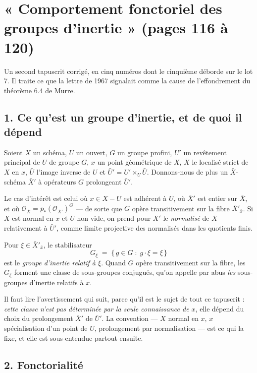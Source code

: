 \documentclass[11pt,a4paper]{article}
\begin{document}
\section*{« Comportement fonctoriel des groupes d'inertie » (pages 116 à 120)}

Un second tapuscrit corrigé, en cinq numéros dont le cinquième déborde sur le
lot 7. Il traite ce que la lettre de 1967 signalait comme la cause de
l'effondrement du théorème 6.4 de Murre.

\subsection*{1. Ce qu'est un groupe d'inertie, et de quoi il dépend}

Soient $X$ un schéma, $U$ un ouvert, $G$ un groupe profini, $U'$ un revêtement
principal de $U$ de groupe $G$, $x$ un point géométrique de $X$, $\bar{X}$ le
localisé strict de $X$ en $x$, $\bar{U}$ l'image inverse de $U$ et
$\bar{U}' = U' \times_{U} \bar{U}$. Donnons-nous de plus un $\bar{X}$-schéma
$\bar{X}'$ à opérateurs $G$ prolongeant $\bar{U}'$.

Le cas d'intérêt est celui où $x \in X - U$ est adhérent à $U$, où $\bar{X}'$
est entier sur $\bar{X}$, et où
$\mathcal{O}_{\bar{X}} = \bar{p}_{*}(\mathcal{O}_{\bar{X}'})^{G}$ --- de sorte
que $G$ opère transitivement sur la fibre $\bar{X}'_{\bar{x}}$. Si $X$ est
normal en $x$ et $\bar{U}$ non vide, on prend pour $\bar{X}'$ le
\emph{normalisé} de $\bar{X}$ relativement à $\bar{U}'$, comme limite projective
des normalisés dans les quotients finis.

Pour $\xi \in \bar{X}'_{\bar{x}}$, le stabilisateur
\[
  G_{\xi} \;=\; \{\, g \in G \;:\; g\cdot\xi = \xi \,\}
\]
est le \emph{groupe d'inertie relatif à $\xi$}. Quand $G$ opère transitivement
sur la fibre, les $G_{\xi}$ forment une classe de sous-groupes conjugués, qu'on
appelle par abus \emph{les} sous-groupes d'inertie relatifs à $x$.

Il faut lire l'avertissement qui suit, parce qu'il est le sujet de tout ce
tapuscrit : \emph{cette classe n'est pas déterminée par la seule connaissance
de $x$}, elle dépend du choix du prolongement $\bar{X}'$ de $\bar{U}'$. La
convention --- $X$ normal en $x$, $x$ spécialisation d'un point de $U$,
prolongement par normalisation --- est ce qui la fixe, et elle est sous-entendue
partout ensuite.

\subsection*{2. Fonctorialité}
\end{document}
